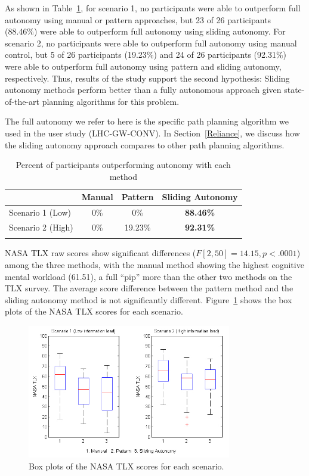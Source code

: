 \documentclass[lettersize, apacite, twoside, HRI]{apa_HRI}
\begin{document}
As shown in Table~\ref{CompareToFullAutonomy}, for scenario 1, no participants were able to outperform full autonomy using manual or pattern approaches, but 23 of 26 participants (88.46\%) were able to outperform full autonomy using sliding autonomy. For scenario 2, no participants were able to outperform full autonomy using manual control, but 5 of 26 participants (19.23\%) and 24 of 26 participants (92.31\%) were able to outperform full autonomy using pattern and sliding autonomy, respectively. Thus, results of the study support the second hypothesis: Sliding autonomy methods perform better than a fully autonomous approach given state-of-the-art planning algorithms for this problem.

The full autonomy we refer to here is the specific path planning algorithm we used in the user study (LHC-GW-CONV). In Section~\ref{Reliance}, we discuss how the sliding autonomy approach compares to other path planning algorithms.

\begin{table}
\caption{Percent of participants outperforming autonomy with each method}
	\centering
		\begin{tabular}
			{|l|c|c|c|}
			\hline
			 & Manual & Pattern & Sliding Autonomy \\
			\hline
			Scenario 1 (Low) & 0\% & 0\% & \textbf{88.46\%} \\
			\hline
			Scenario 2 (High) & 0\% & 19.23\% & \textbf{92.31\%} \\
			\hline			
			\multicolumn{4}{c}{}  %
		\end{tabular}
\label{CompareToFullAutonomy}
\end{table}

NASA TLX raw scores show significant differences ($F[2,50]=14.15, p<.0001$) among the three methods, with the manual method showing the highest cognitive mental workload (61.51), a full ``pip'' more than the other two methods on the TLX survey. The average score difference between the pattern method and the sliding autonomy method is not significantly different. Figure~\ref{NASATLX} shows the box plots of the NASA TLX scores for each scenario.

\begin{figure}
\centering
\includegraphics[width=3.5in]{NASATLXBoxPlot.JPG}
\caption{Box plots of the NASA TLX scores for each scenario.}
\label{NASATLX}
\end{figure}
\end{document}
